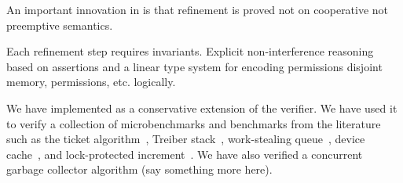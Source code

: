 An important innovation in \civl is that refinement is proved not on cooperative not preemptive semantics.

Each refinement step requires invariants. 
Explicit non-interference reasoning based on assertions and a linear type system for encoding permissions disjoint memory, 
permissions, etc. logically.

We have implemented \civl as a conservative extension of the \boogie verifier.  
We have used it to verify a collection of microbenchmarks and benchmarks from the literature such as
the ticket algorithm~\cite{ticket}, Treiber stack~\cite{treiber}, work-stealing queue~\cite{wsq},
device cache~\cite{device-cache}, and lock-protected increment~\cite{incr}.
We have also verified a concurrent garbage collector algorithm (say something more here).
